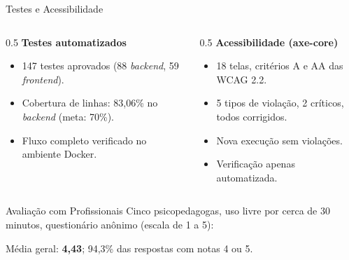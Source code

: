 \documentclass[compress]{beamer}
\begin{document}
\begin{frame}{Testes e Acessibilidade}
\begin{columns}[T]
\begin{column}{0.5\textwidth}
\textbf{Testes automatizados}
\begin{itemize}
    \small
    \item 147 testes aprovados (88 \textit{backend}, 59 \textit{frontend}).
    \item Cobertura de linhas: 83,06\% no \textit{backend} (meta: 70\%).
    \item Fluxo completo verificado no ambiente Docker.
\end{itemize}
\end{column}
\begin{column}{0.5\textwidth}
\textbf{Acessibilidade (axe-core)}
\begin{itemize}
    \small
    \item 18 telas, critérios A e AA das WCAG 2.2.
    \item 5 tipos de violação, 2 críticos, todos corrigidos.
    \item Nova execução sem violações.
    \item Verificação apenas automatizada.
\end{itemize}
\end{column}
\end{columns}
\end{frame}

\begin{frame}{Avaliação com Profissionais}
\small
Cinco psicopedagogas, uso livre por cerca de 30 minutos, questionário anônimo (escala de 1 a 5):
\vspace{0.1cm}

\centering
{}

\raggedright
Média geral: \textbf{4,43}; 94,3\% das respostas com notas 4 ou 5.
\end{frame}
\end{document}
